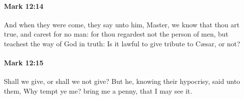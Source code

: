 		\paragraph{Mark 12:14} %
			\label{MARK-12-14}

			And when they were come, they say unto him, Master, we know that thou art true, and carest for no man: for thou regardest not the person of men, but teachest the way of God in truth: Is it lawful to give tribute to Cæsar, or not?

			\begin{framed}
			\scriptsize
				\begin{compactdesc}
					\item[SBLG] 
				\end{compactdesc}
			\end{framed}

		\paragraph{Mark 12:15} %
			\label{MARK-12-15}

			Shall we give, or shall we not give? But he, knowing their hypocrisy, said unto them, Why tempt ye me? bring me a penny, that I may see it.

